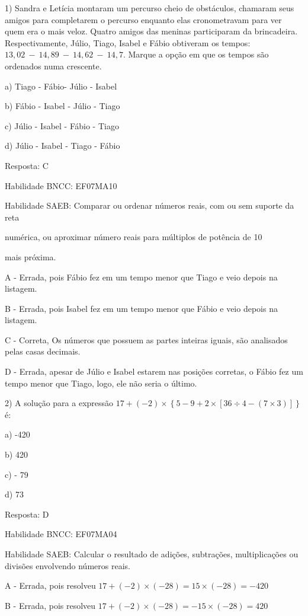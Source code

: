 {1) Sandra e Letícia montaram um percurso cheio de obstáculos, chamaram
seus amigos para completarem o percurso enquanto elas cronometravam para
ver quem era o mais veloz. Quatro amigos das meninas participaram da
brincadeira. Respectivamente, Júlio, Tiago, Isabel e Fábio obtiveram os
tempos: \(13,02\  - \ 14,89\  - \ 14,62\  - \ 14,7\). Marque a opção em
que os tempos são ordenados numa crescente.~

a) Tiago - Fábio- Júlio - Isabel

b) Fábio - Isabel - Júlio - Tiago

c) Júlio - Isabel - Fábio - Tiago

d) Júlio - Isabel - Tiago - Fábio

Resposta: C

Habilidade BNCC: EF07MA10

Habilidade SAEB: Comparar ou ordenar números reais, com ou sem suporte
da reta

numérica, ou aproximar número reais para múltiplos de potência de 10

mais próxima.

A - Errada, pois Fábio fez em um tempo menor que Tiago e veio depois na
listagem.

B - Errada, pois Isabel fez em um tempo menor que Fábio e veio depois na
listagem.

C - Correta, Os números que possuem as partes inteiras iguais, são
analisados pelas casas decimais.

D - Errada, apesar de Júlio e Isabel estarem nas posições corretas, o
Fábio fez um tempo menor que Tiago, logo, ele não seria o último.

2) A solução para a expressão
\(17 + ( - 2) \times \left\{ 5 - 9 + 2 \times \left\lbrack 36 \div 4 - \left( 7 \times 3 \right) \right\rbrack \right\}\)
é:

a) -420

b) 420

c) - 79

d) 73

Resposta: D

Habilidade BNCC: EF07MA04

Habilidade SAEB: Calcular o resultado de adições, subtrações,
multiplicações ou divisões envolvendo números reais.

A - Errada, pois resolveu
\(17 + ( - 2) \times \left( - 28 \right) = 15 \times ( - 28) = - 420\ \)

B - Errada, pois resolveu
\(17 + ( - 2) \times \left( - 28 \right) = - 15 \times ( - 28) = 420\ \)

}
